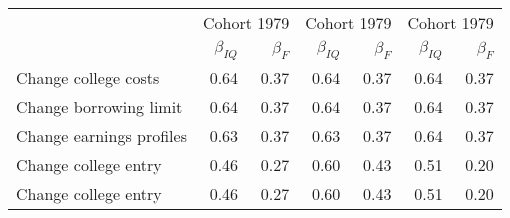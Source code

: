 \begin{tabular}{lrrrrrr}
\hline
   & \multicolumn{2}{|c|}{Cohort 1979} & \multicolumn{2}{|c|}{Cohort 1979} & \multicolumn{2}{|c|}{Cohort 1979} \\ 
 & $\beta_{IQ}$  & $\beta_{F}$  & $\beta_{IQ}$  & $\beta_{F}$  & $\beta_{IQ}$  & $\beta_{F}$  \\ 
\hline
Change college costs & 0.64  & 0.37  & 0.64  & 0.37  & 0.64  & 0.37  \\ 
Change borrowing limit & 0.64  & 0.37  & 0.64  & 0.37  & 0.64  & 0.37  \\ 
Change earnings profiles & 0.63  & 0.37  & 0.63  & 0.37  & 0.64  & 0.37  \\ 
Change college entry & 0.46  & 0.27  & 0.60  & 0.43  & 0.51  & 0.20  \\ 
Change college entry & 0.46  & 0.27  & 0.60  & 0.43  & 0.51  & 0.20  \\ 
\hline
\end{tabular}%
